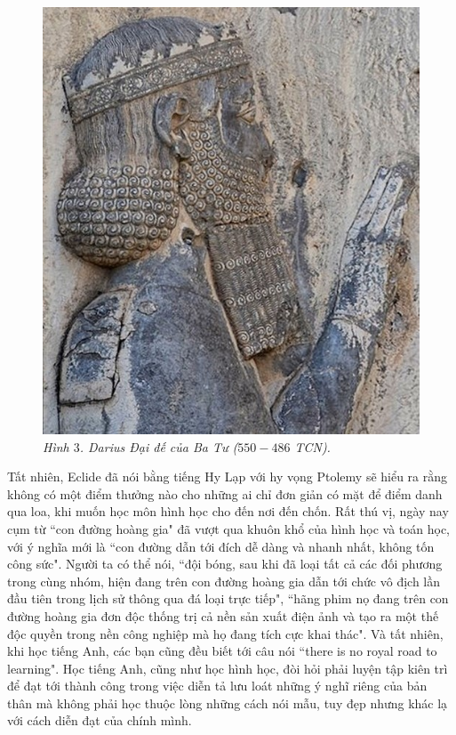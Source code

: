 \begin{multicols}{2}
\begin{figure}[H]
		\includegraphics[width= 0.6\linewidth]{2}
		\caption{\small\textit{\color{quantoan}Hình $3$. Darius Đại đế của Ba Tư ($550-486$ TCN).}}
		\vspace*{-10pt}
	\end{figure}
	Tất nhiên, Eclide đã  nói bằng tiếng Hy Lạp với hy vọng Ptolemy sẽ hiểu ra rằng không có một điểm thưởng nào cho những ai chỉ đơn giản có mặt để điểm danh qua loa, khi muốn học môn hình học cho đến nơi đến chốn.
	\vskip 0.1cm
	Rất thú vị, ngày nay cụm từ ``con đường hoàng gia" đã vượt qua khuôn khổ của hình học và toán học, với ý nghĩa mới là ``con đường dẫn tới đích dễ dàng và nhanh nhất, không tốn công sức". Người ta có thể nói, ``đội bóng, sau khi đã loại tất cả các đối phương trong cùng nhóm, hiện đang trên con đường hoàng gia dẫn tới chức vô địch lần đầu tiên trong lịch sử thông qua đá loại trực tiếp", ``hãng phim nọ đang trên con đường hoàng gia đơn độc thống trị cả nền sản xuất điện ảnh và  tạo ra một thế độc quyền trong nền công nghiệp mà họ đang tích cực khai thác". Và tất nhiên, khi học tiếng Anh, các bạn cũng đều biết tới câu nói ``there is no royal road to learning". Học tiếng Anh, cũng như học hình học, đòi hỏi phải luyện tập kiên trì để đạt tới thành công trong việc diễn tả lưu loát những ý nghĩ riêng của bản thân mà không phải học thuộc lòng những cách nói mẫu, tuy đẹp nhưng khác lạ với cách diễn đạt của chính mình. 
	\begin{figure}[H]
		\vspace*{-5pt}
		\centering
		\captionsetup{labelformat= empty, justification=centering}

\end{figure}
\end{multicols}
